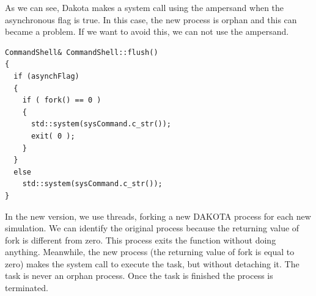 \documentclass[12pt,a4paper,article]{memoir} %
\begin{document}
As we can see, Dakota makes a system call using the ampersand when the asynchronous flag is true. In this case, the new process is orphan and this can became a problem. If we want to avoid this, we can not use the ampersand.

\begin{lstlisting}[frame=single]
CommandShell& CommandShell::flush()
{
  if (asynchFlag)
  {
    if ( fork() == 0 )
    {
      std::system(sysCommand.c_str());
      exit( 0 );
    }
  }
  else
    std::system(sysCommand.c_str());
}
\end{lstlisting}

In the new version, we use threads, forking a new DAKOTA process for each new simulation. We can identify the original process because the returning value of fork is different from zero. This process exits the function without doing anything. Meanwhile, the new process (the returning value of fork is equal to zero) makes the system call to execute the task, but without detaching it. The task is never an orphan process. Once the task is finished the process is terminated.

\end{document}
